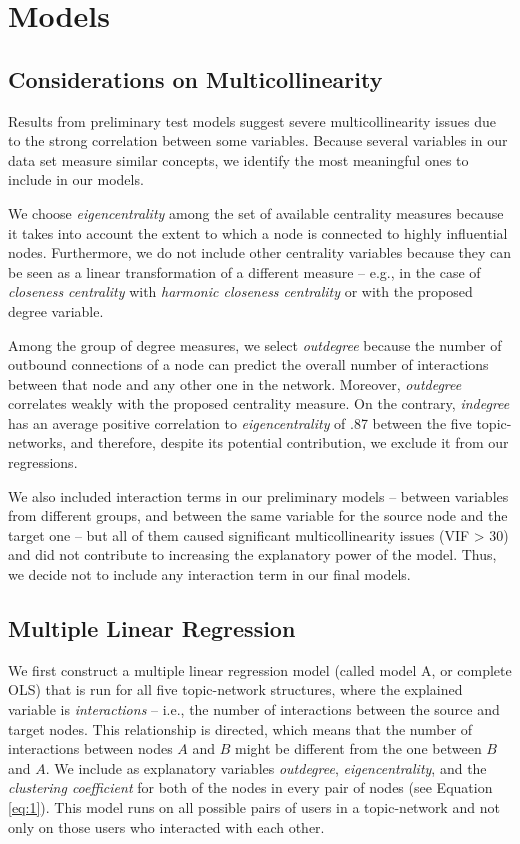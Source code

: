 \section{Models}\label{Models}\thispagestyle{SectionFirstPage} %
\subsection{Considerations on Multicollinearity}\label{multicollinearity}
Results from preliminary test models suggest severe multicollinearity issues due to the strong correlation between some variables. Because several variables in our data set measure similar concepts, we identify the most meaningful ones to include in our models.

We choose \textit{eigencentrality} among the set of available centrality measures because it takes into account the extent to which a node is connected to highly influential nodes. Furthermore, we do not include other centrality variables because they can be seen as a linear transformation of a different measure – e.g., in the case of \textit{closeness centrality} with \textit{harmonic closeness centrality} or with the proposed degree variable.

Among the group of degree measures, we select \textit{outdegree} because the number of outbound connections of a node can predict the overall number of interactions between that node and any other one in the network. Moreover, \textit{outdegree} correlates weakly with the proposed centrality measure. On the contrary, \textit{indegree} has an average positive correlation to \textit{eigencentrality} of .87 between the five topic-networks, and therefore, despite its potential contribution, we exclude it from our regressions.

We also included interaction terms in our preliminary models – between variables from different groups, and between the same variable for the source node and the target one – but all of them caused significant multicollinearity issues (VIF > 30) and did not contribute to increasing the explanatory power of the model. Thus, we decide not to include any interaction term in our final models.
\subsection{Multiple Linear Regression}
We first construct a multiple linear regression model (called model A, or complete OLS) that is run for all five topic-network structures, where the explained variable is \textit{interactions} – i.e., the number of interactions between the source and target nodes. This relationship is directed, which means that the number of interactions between nodes $A$ and $B$ might be different from the one between $B$ and $A$. We include as explanatory variables \textit{outdegree}, \textit{eigencentrality}, and the \textit{clustering coefficient} for both of the nodes in every pair of nodes (see Equation \vref{eq:1}). This model runs on all possible pairs of users in a topic-network and not only on those users who interacted with each other.

